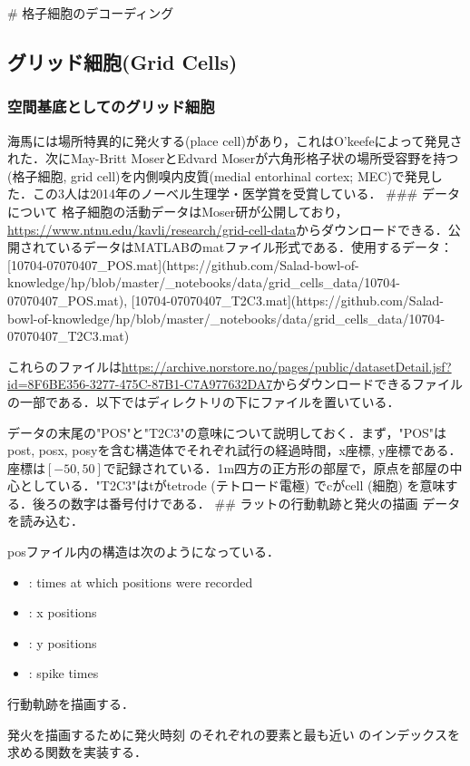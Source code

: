 # 格子細胞のデコーディング
\subsection{グリッド細胞(Grid Cells)}

\subsubsection{空間基底としてのグリッド細胞}
海馬には場所特異的に発火する\textbf{}(place cell)があり，これはO'keefeによって発見された．次にMay-Britt MoserとEdvard Moserが六角形格子状の場所受容野を持つ\textbf{}(格子細胞, grid cell)を内側嗅内皮質(medial entorhinal cortex; MEC)で発見した．この3人は2014年のノーベル生理学・医学賞を受賞している．
### データについて
格子細胞の活動データはMoser研が公開しており，\url{https://www.ntnu.edu/kavli/research/grid-cell-data}からダウンロードできる．公開されているデータはMATLABのmatファイル形式である．使用するデータ：[10704-07070407_POS.mat](https://github.com/Salad-bowl-of-knowledge/hp/blob/master/_notebooks/data/grid_cells_data/10704-07070407_POS.mat), [10704-07070407_T2C3.mat](https://github.com/Salad-bowl-of-knowledge/hp/blob/master/_notebooks/data/grid_cells_data/10704-07070407_T2C3.mat)

これらのファイルは\url{https://archive.norstore.no/pages/public/datasetDetail.jsf?id=8F6BE356-3277-475C-87B1-C7A977632DA7}からダウンロードできるファイルの一部である．以下ではディレクトリの下にファイルを置いている．

データの末尾の"POS"と"T2C3"の意味について説明しておく．まず，"POS"はpost, posx, posyを含む構造体でそれぞれ試行の経過時間，x座標, y座標である．座標は$[-50, 50]$で記録されている．1m四方の正方形の部屋で，原点を部屋の中心としている．"T2C3"はtがtetrode (テトロード電極) でcがcell (細胞) を意味する．後ろの数字は番号付けである． 
## ラットの行動軌跡と発火の描画
データを読み込む．


posファイル内の構造は次のようになっている．
\begin{itemize}
\item {}: times at which positions were recorded
\item {}: x positions
\item {}: y positions
\item {}: spike times
\end{itemize}

行動軌跡を描画する．


発火を描画するために発火時刻  のそれぞれの要素と最も近い  のインデックスを求める関数を実装する．




